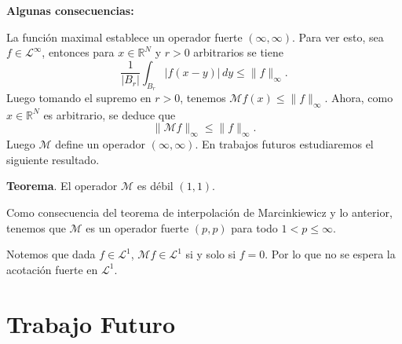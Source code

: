 \documentclass[a0,portrait]{a0poster}
\begin{document}
\begin{multicols}{2}
{{{\begin{minipage}{.93\columnwidth}
\vspace{0.6cm}

{\bf Algunas consecuencias:}
    
La función maximal establece un operador fuerte $(\infty,\infty)$. Para ver esto, sea $f\in \mathcal{L}^{\infty}$, entonces para $x\in \mathbb{R}^N$ y $r>0$ arbitrarios se tiene
\begin{equation*}
    \frac{1}{|B_r|}\int_{B_r} |f(x-y)|\, dy \leq \|f\|_{\infty}.
\end{equation*}
Luego tomando el supremo en $r>0$, tenemos $\mathcal{M}f(x)\leq \|f\|_{\infty}$. Ahora, como $x\in \mathbb{R}^N$ es arbitrario, se deduce que
\begin{equation*}
  \|\mathcal{M}f\|_{\infty}\leq \|f\|_{\infty}.   
\end{equation*}
Luego $\mathcal{M}$ define un operador $(\infty,\infty)$. En trabajos futuros estudiaremos el siguiente resultado.

\vspace{0.6cm}

{\bf Teorema}. {El operador $\mathcal{M}$ es débil $(1,1)$.}

\vspace{0.3cm}

Como consecuencia del teorema de interpolación de Marcinkiewicz y lo anterior, tenemos que $\mathcal{M}$ es un operador fuerte $(p,p)$ para todo $1<p\leq \infty$.

\vspace{0.4cm}


Notemos que dada $f\in \mathcal{L}^1$, $\mathcal{M}f \in \mathcal{L}^1$ si y solo si $f=0$. Por lo que no se espera la acotación fuerte en $\mathcal{L}^1$. 



						
		\end{minipage}}}}			

    
				
		\vspace{-1.3cm}
		
		\section{Trabajo Futuro}
		
		{ }
\end{multicols}
\end{document}
